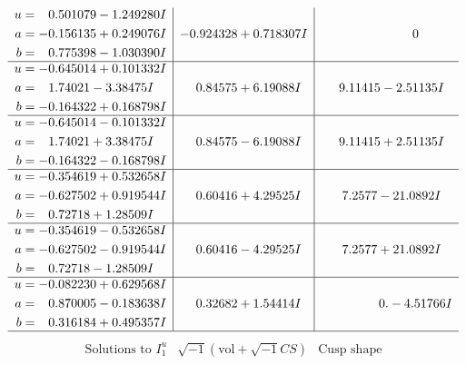 \documentclass[1p]{elsarticle_modified}
\theoremstyle{definition}
\newcommand{\I}{\sqrt{-1}}
\begin{document}
$$\begin{array}{c|c|c}
\begin{aligned}
u &= \phantom{-}0.501079 - 1.249280 I \\
a &= -0.156135 + 0.249076 I \\
b &= \phantom{-}0.775398 - 1.030390 I\end{aligned}
 & -0.924328 + 0.718307 I & \phantom{-0.000000 } 0 \\ \hline\begin{aligned}
u &= -0.645014 + 0.101332 I \\
a &= \phantom{-}1.74021 - 3.38475 I \\
b &= -0.164322 + 0.168798 I\end{aligned}
 & \phantom{-}0.84575 + 6.19088 I & \phantom{-}9.11415 - 2.51135 I \\ \hline\begin{aligned}
u &= -0.645014 - 0.101332 I \\
a &= \phantom{-}1.74021 + 3.38475 I \\
b &= -0.164322 - 0.168798 I\end{aligned}
 & \phantom{-}0.84575 - 6.19088 I & \phantom{-}9.11415 + 2.51135 I \\ \hline\begin{aligned}
u &= -0.354619 + 0.532658 I \\
a &= -0.627502 + 0.919544 I \\
b &= \phantom{-}0.72718 + 1.28509 I\end{aligned}
 & \phantom{-}0.60416 + 4.29525 I & \phantom{-}7.2577 - 21.0892 I \\ \hline\begin{aligned}
u &= -0.354619 - 0.532658 I \\
a &= -0.627502 - 0.919544 I \\
b &= \phantom{-}0.72718 - 1.28509 I\end{aligned}
 & \phantom{-}0.60416 - 4.29525 I & \phantom{-}7.2577 + 21.0892 I \\ \hline\begin{aligned}
u &= -0.082230 + 0.629568 I \\
a &= \phantom{-}0.870005 - 0.183638 I \\
b &= \phantom{-}0.316184 + 0.495357 I\end{aligned}
 & \phantom{-}0.32682 + 1.54414 I & \phantom{-0.000000 } 0. - 4.51766 I\\
 \hline 
 \end{array}$$\newpage$$\begin{array}{c|c|c}  
\text{Solutions to }I^u_{1}& \I (\text{vol} + \sqrt{-1}CS) & \text{Cusp shape}\\

\end{array}$$
\end{document}
